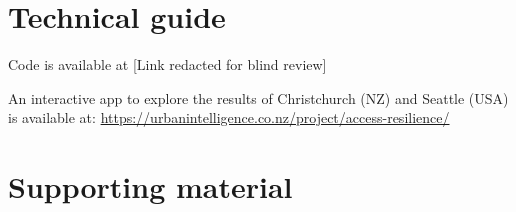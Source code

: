 \documentclass[review,3p,times,onecolumn,sort&compress,12pt]{elsarticle}
\begin{document}


\printbibliography

\clearpage
\newpage
\appendix

\section{Technical guide}

\noindent Code is available at [Link redacted for blind review] %

\noindent An interactive app to explore the results of Christchurch (NZ) and Seattle (USA) is available at: \url{https://urbanintelligence.co.nz/project/access-resilience/}


\clearpage
\section{Supporting material}
\end{document}
